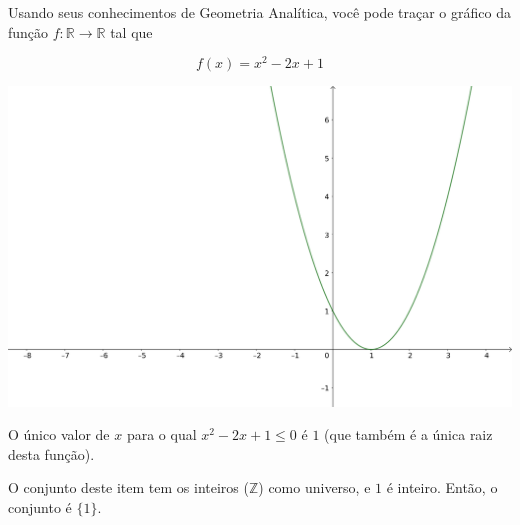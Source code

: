 \documentclass[
  letterpaper,
  DIV=11,
  numbers=noendperiod]{scrreprt}
\begin{document}
\begin{tcolorbox}[enhanced jigsaw, breakable, toptitle=1mm, opacitybacktitle=0.6, colback=white, toprule=.15mm, left=2mm, rightrule=.15mm, leftrule=.75mm, title={Resposta (a)}, coltitle=black, arc=.35mm, bottomtitle=1mm, opacityback=0, bottomrule=.15mm, colframe=quarto-callout-important-color-frame, titlerule=0mm, colbacktitle=quarto-callout-important-color!10!white]

Usando seus conhecimentos de Geometria Analítica, você pode traçar o
gráfico da função $f : \mathbb{R}\to \mathbb{R}$ tal que

\[
f(x) = x^2 - 2x + 1
\]

\includegraphics{images/ex-02.02-funcao.png}

O único valor de $x$ para o qual $x^2 - 2x + 1 \leq 0$ é $1$ (que também
é a única raiz desta função).

O conjunto deste item tem os inteiros ($\mathbb{Z}$) como universo, e
$1$ é inteiro. Então, o conjunto é $\{ 1 \}$.

\end{tcolorbox}
\end{document}
